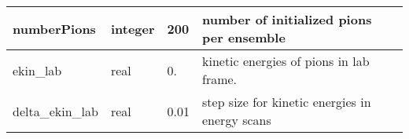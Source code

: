 \documentclass{article}
\begin{document}
\begin{longtable}{llll}
\midrule
numberPions & \begin{minipage}[t]{2cm}integer\end{minipage} & \begin{minipage}[t]{2cm}200\end{minipage} & \begin{minipage}[t]{12cm}number of initialized pions per ensemble\end{minipage}\\*
\midrule
ekin\_lab & \begin{minipage}[t]{2cm}real\end{minipage} & \begin{minipage}[t]{2cm}0.\end{minipage} & \begin{minipage}[t]{12cm}kinetic energies of pions in lab frame.\end{minipage}\\*
\midrule
delta\_ekin\_lab & \begin{minipage}[t]{2cm}real\end{minipage} & \begin{minipage}[t]{2cm}0.01\end{minipage} & \begin{minipage}[t]{12cm}step size for kinetic energies in energy scans\end{minipage}\\*
\bottomrule
\end{longtable}
{ }



\end{document}
